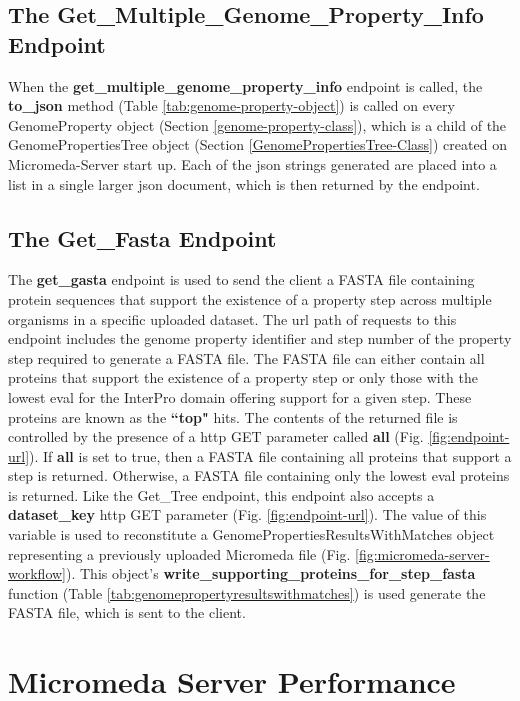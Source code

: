 \subsection{The Get\_Multiple\_Genome\_Property\_Info Endpoint}

When the \textbf{get\_multiple\_genome\_property\_info} endpoint is called, the \textbf{to\_json} method (Table \ref{tab:genome-property-object}) is called on every GenomeProperty object (Section \ref{genome-property-class}), which is a child of the GenomePropertiesTree object (Section \ref{GenomePropertiesTree-Class}) created on Micromeda-Server start up. Each of the \gls{json} strings generated are placed into a list in a single larger \gls{json} document, which is then returned by the endpoint. 

\subsection{The Get\_Fasta Endpoint} \label{get-fasta-endpoint}

The \textbf{get\_gasta} endpoint is used to send the client a FASTA file containing protein sequences that support the existence of a property step across multiple organisms in a specific uploaded dataset. The \gls{url} path of requests to this endpoint includes the genome property identifier and step number of the property step required to generate a FASTA file. The FASTA file can either contain all proteins that support the existence of a property step or only those with the lowest \gls{eval} for the InterPro domain offering support for a given step. These proteins are known as the \textbf{``top"} hits. The contents of the returned file is controlled by the presence of a \gls{http} GET parameter called \textbf{all} (Fig. \ref{fig:endpoint-url}). If \textbf{all} is set to true, then a FASTA file containing all proteins that support a step is returned. Otherwise, a FASTA file containing only the lowest \gls{eval} proteins is returned. Like the Get\_Tree endpoint, this endpoint also accepts a \textbf{dataset\_key} \gls{http} GET parameter (Fig. \ref{fig:endpoint-url}). The value of this variable is used to reconstitute a GenomePropertiesResultsWithMatches object representing a previously uploaded Micromeda file (Fig. \ref{fig:micromeda-server-workflow}). This object's \textbf{write\_supporting\_proteins\_for\_step\_fasta} function (Table \ref{tab:genomepropertyresultswithmatches}) is used generate the FASTA file, which is sent to the client.

\section{Micromeda Server Performance} \label{micromeda-server-performance}

